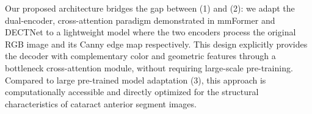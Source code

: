 Our proposed architecture bridges the gap between (1) and (2): we adapt the dual-encoder, cross-attention paradigm demonstrated in mmFormer and DECTNet to a lightweight model where the two encoders process the original RGB image and its Canny edge map respectively. This design explicitly provides the decoder with complementary color and geometric features through a bottleneck cross-attention module, without requiring large-scale pre-training. Compared to large pre-trained model adaptation (3), this approach is computationally accessible and directly optimized for the structural characteristics of cataract anterior segment images.
